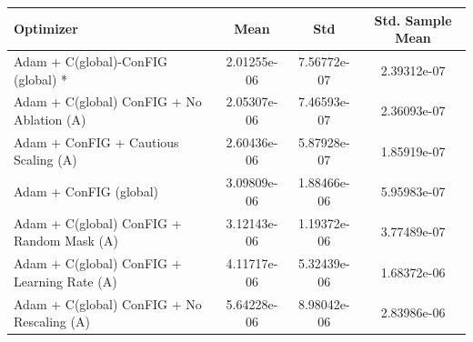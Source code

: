 \begin{table}[H]
    \centering
    \label{tab:optimizer_results}
    \begin{tabular}{lccc}
        \toprule
        \textbf{Optimizer} & \textbf{Mean} & \textbf{Std} & \textbf{Std. Sample Mean} \\
        \midrule
        Adam + C(global)-ConFIG (global) * & 2.01255e-06 & 7.56772e-07 & 2.39312e-07 \\
        Adam + C(global) ConFIG + No Ablation (A) & 2.05307e-06 & 7.46593e-07 & 2.36093e-07 \\
        Adam + ConFIG + Cautious Scaling (A) & 2.60436e-06 & 5.87928e-07 & 1.85919e-07 \\
        Adam + ConFIG (global) & 3.09809e-06 & 1.88466e-06 & 5.95983e-07 \\
        Adam + C(global) ConFIG + Random Mask (A) & 3.12143e-06 & 1.19372e-06 & 3.77489e-07 \\
        Adam + C(global) ConFIG +  Learning Rate (A) & 4.11717e-06 & 5.32439e-06 & 1.68372e-06 \\
        Adam + C(global) ConFIG +  No Rescaling (A) & 5.64228e-06 & 8.98042e-06 & 2.83986e-06 \\
        \bottomrule
    \end{tabular}
\end{table}

